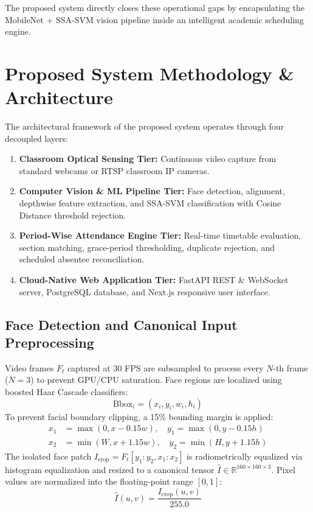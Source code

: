 \documentclass[conference]{IEEEtran}
\begin{document}
The proposed system directly closes these operational gaps by encapsulating the MobileNet + SSA-SVM vision pipeline inside an intelligent academic scheduling engine.

\section{Proposed System Methodology \& Architecture}

The architectural framework of the proposed system operates through four decoupled layers:
\begin{enumerate}
    \item \textbf{Classroom Optical Sensing Tier:} Continuous video capture from standard webcams or RTSP classroom IP cameras.
    \item \textbf{Computer Vision \& ML Pipeline Tier:} Face detection, alignment, depthwise feature extraction, and SSA-SVM classification with Cosine Distance threshold rejection.
    \item \textbf{Period-Wise Attendance Engine Tier:} Real-time timetable evaluation, section matching, grace-period thresholding, duplicate rejection, and scheduled absentee reconciliation.
    \item \textbf{Cloud-Native Web Application Tier:} FastAPI REST \& WebSocket server, PostgreSQL database, and Next.js responsive user interface.
\end{enumerate}

\subsection{Face Detection and Canonical Input Preprocessing}
Video frames $F_t$ captured at 30 FPS are subsampled to process every $N$-th frame ($N=3$) to prevent GPU/CPU saturation. Face regions are localized using boosted Haar Cascade classifiers:
\begin{equation}
\text{Bbox}_i = (x_i, y_i, w_i, h_i)
\end{equation}
To prevent facial boundary clipping, a 15\% bounding margin is applied:
\begin{align}
x_1 &= \max(0, x - 0.15w), \quad y_1 = \max(0, y - 0.15h) \\
x_2 &= \min(W, x + 1.15w), \quad y_2 = \min(H, y + 1.15h)
\end{align}
The isolated face patch $I_{\text{crop}} = F_t[y_1:y_2, x_1:x_2]$ is radiometrically equalized via histogram equalization and resized to a canonical tensor $\hat{I} \in \mathbb{R}^{160 \times 160 \times 3}$. Pixel values are normalized into the floating-point range $[0, 1]$:
\begin{equation}
\hat{I}(u, v) = \frac{I_{\text{crop}}(u, v)}{255.0}
\end{equation}
\end{document}
